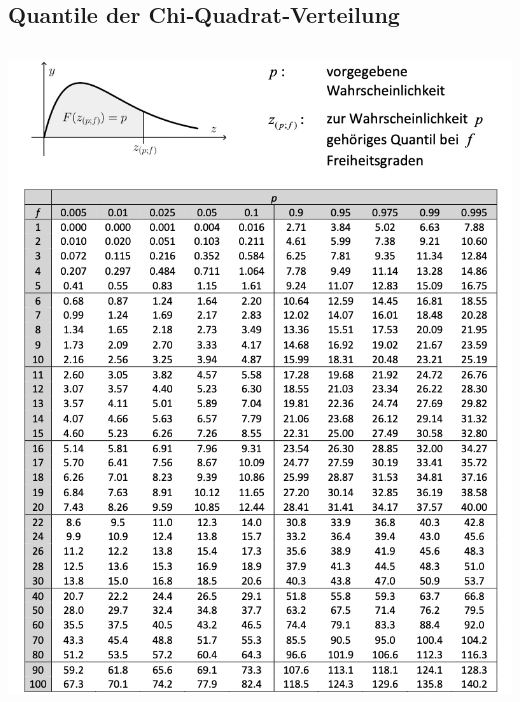 \documentclass[8pt,a4paper]{scrartcl}
\begin{document}
\begin{multicols*}{2}
	\subsection{Quantile der Chi‐Quadrat‐Verteilung}
		\includegraphics[height=17.5cm]{img/QuantileChi.png}

\end{multicols*}
\end{document}
